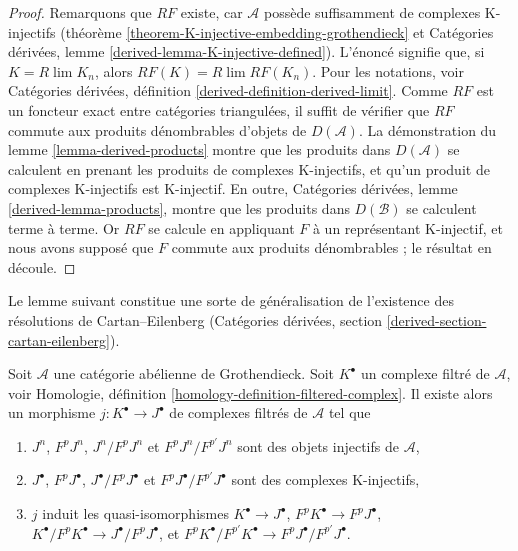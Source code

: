 \begin{proof}
Remarquons que $RF$ existe, car $\mathcal{A}$ possède suffisamment de
complexes K-injectifs (théorème
\ref{theorem-K-injective-embedding-grothendieck} et
Catégories dérivées, lemme \ref{derived-lemma-K-injective-defined}).
L'énoncé signifie que, si $K = R\lim K_n$, alors
$RF(K) = R\lim RF(K_n)$. Pour les notations, voir
Catégories dérivées, définition \ref{derived-definition-derived-limit}.
Comme $RF$ est un foncteur exact entre catégories triangulées, il suffit de
vérifier que $RF$ commute aux produits dénombrables d'objets de
$D(\mathcal{A})$. La démonstration du
lemme \ref{lemma-derived-products} montre que les produits dans
$D(\mathcal{A})$ se calculent en prenant les produits de complexes
K-injectifs, et qu'un produit de complexes K-injectifs est K-injectif.
En outre, Catégories dérivées,
lemme \ref{derived-lemma-products}, montre que les produits dans
$D(\mathcal{B})$ se calculent terme à terme.
Or $RF$ se calcule en appliquant $F$ à un représentant K-injectif, et nous
avons supposé que $F$ commute aux produits dénombrables ; le résultat en
découle.
\end{proof}
\noindent
Le lemme suivant constitue une sorte de généralisation de
l'existence des résolutions de Cartan--Eilenberg
(Catégories dérivées, section \ref{derived-section-cartan-eilenberg}).

\begin{lemma}
\label{lemma-K-injective-embedding-filtration}
Soit $\mathcal{A}$ une catégorie abélienne de Grothendieck.
Soit $K^\bullet$ un complexe filtré de $\mathcal{A}$, voir
Homologie, définition \ref{homology-definition-filtered-complex}.
Il existe alors un morphisme $j : K^\bullet \to J^\bullet$
de complexes filtrés de $\mathcal{A}$ tel que
\begin{enumerate}
\item $J^n$, $F^pJ^n$, $J^n/F^pJ^n$ et $F^pJ^n/F^{p'}J^n$ sont des
objets injectifs de $\mathcal{A}$,
\item $J^\bullet$, $F^pJ^\bullet$, $J^\bullet/F^pJ^\bullet$ et
$F^pJ^\bullet/F^{p'}J^\bullet$ sont des complexes K-injectifs,
\item $j$ induit les quasi-isomorphismes
$K^\bullet \to J^\bullet$,
$F^pK^\bullet \to F^pJ^\bullet$,
$K^\bullet/F^pK^\bullet \to J^\bullet/F^pJ^\bullet$, et
$F^pK^\bullet/F^{p'}K^\bullet \to F^pJ^\bullet/F^{p'}J^\bullet$.
\end{enumerate}
\end{lemma}

